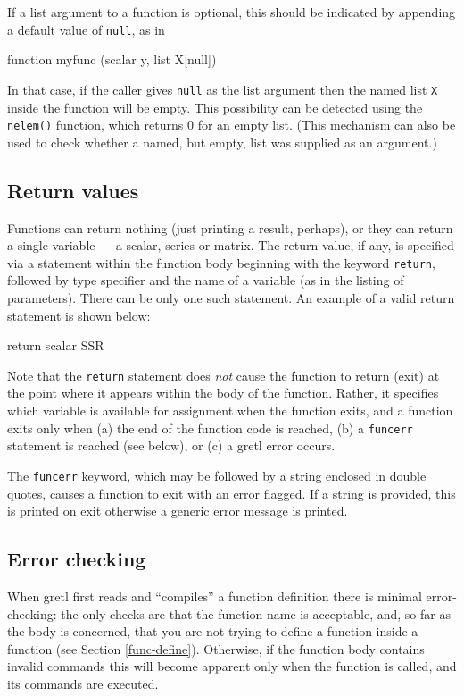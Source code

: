 If a list argument to a function is optional, this should be indicated
by appending a default value of \texttt{null}, as in
%
\begin{code}
     function myfunc (scalar y, list X[null])
\end{code}
%
In that case, if the caller gives \texttt{null} as the list argument
then the named list \texttt{X} inside the function will be empty.
This possibility can be detected using the \texttt{nelem()} function,
which returns 0 for an empty list.  (This mechanism can also be used
to check whether a named, but empty, list was supplied as an
argument.)

\subsection{Return values}

Functions can return nothing (just printing a result, perhaps), or
they can return a single variable --- a scalar, series or matrix.  The
return value, if any, is specified via a statement within the function
body beginning with the keyword \verb+return+, followed by type
specifier and the name of a variable (as in the listing of
parameters).  There can be only one such statement.  An example of a
valid return statement is shown below:
%    
\begin{code}
      return scalar SSR
\end{code}
%
Note that the \verb+return+ statement does \emph{not} cause the
function to return (exit) at the point where it appears within the
body of the function. Rather, it specifies which variable is
available for assignment when the function exits, and a function exits
only when (a) the end of the function code is reached, (b) a
\verb+funcerr+ statement is reached (see below), or (c) a gretl error
occurs.
    
The \verb+funcerr+ keyword, which may be followed by a string enclosed
in double quotes, causes a function to exit with an error flagged.  If
a string is provided, this is printed on exit otherwise a generic
error message is printed.
    

\subsection{Error checking}

When gretl first reads and ``compiles'' a function definition there is
minimal error-checking: the only checks are that the function name is
acceptable, and, so far as the body is concerned, that you are not
trying to define a function inside a function (see Section
\ref{func-define}). Otherwise, if the function body contains invalid
commands this will become apparent only when the function is called,
and its commands are executed.


